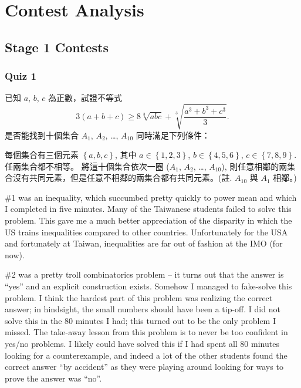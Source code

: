 \documentclass[11pt]{scrreprt}
\begin{document}
\chapter{Contest Analysis}
\section{Stage 1 Contests}
\subsection{Quiz 1}
\begin{enumerate}
  \ii 已知 $a$, $b$, $c$ 為正數，試證不等式 \[ 3(a+b+c) \ge 8\sqrt[3]{abc} + \sqrt[3]{\frac{a^3+b^3+c^3}{3}}. \]
  \ii 是否能找到十個集合 $A_1$, $A_2$, \dots, $A_{10}$ 同時滿足下列條件：
  \begin{enumerate}[(i)]
    \ii 每個集合有三個元素 $\left\{ a,b,c \right\}$, 其中 $a \in \left\{ 1,2,3 \right\}$, $b \in \left\{ 4,5,6 \right\}$, $c \in \left\{ 7,8,9 \right\}$.
    \ii 任兩集合都不相等。
    \ii 將這十個集合依次一圈 ($A_1$, $A_2$, \dots, $A_{10}$), 則任意相鄰的兩集合沒有共同元素，但是任意不相鄰的兩集合都有共同元素。(註. $A_{10}$ 與 $A_1$ 相鄰。)
  \end{enumerate}
\end{enumerate}
\#1 was an inequality, which succumbed pretty quickly to power mean and which I completed in five minutes. Many of the Taiwanese students failed to solve this problem. This gave me a much better appreciation of the disparity in which the US trains inequalities compared to other countries. Unfortunately for the USA and fortunately at Taiwan, inequalities are far out of fashion at the IMO (for now).

\#2 was a pretty troll combinatorics problem -- it turns out that the answer is ``yes'' and an explicit construction exists. Somehow I managed to fake-solve this problem. I think the hardest part of this problem was realizing the correct answer; in hindsight, the small numbers should have been a tip-off. I did not solve this in the 80 minutes I had; this turned out to be the only problem I missed.
The take-away lesson from this problem is to never be too confident in yes/no problems.
I likely could have solved this if I had spent all 80 minutes looking for a counterexample,
and indeed a lot of the other students found the correct answer ``by accident''
as they were playing around looking for ways to prove the answer was ``no''.
\end{document}
